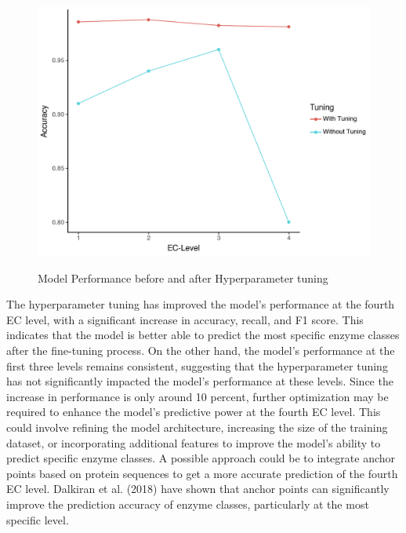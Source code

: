 \begin{figure}[!h]
    \centering
    \begin{minipage}[t]{\textwidth}
    \caption{Model Performance before and after Hyperparameter tuning}
    \includegraphics[scale=0.55]{img/model-performance-comparison.png}
    \label{fig:performance-comparison}
    \end{minipage}
\end{figure}

The hyperparameter tuning has improved the model's performance at the fourth EC level, with a significant increase in accuracy, recall, and F1 score. This indicates that the model is better able to predict the most specific enzyme classes after the fine-tuning process. On the other hand, the model's performance at the first three levels remains consistent, suggesting that the hyperparameter tuning has not significantly impacted the model's performance at these levels. Since the increase in performance is only around 10 percent, further optimization may be required to enhance the model's predictive power at the fourth EC level. This could involve refining the model architecture, increasing the size of the training dataset, or incorporating additional features to improve the model's ability to predict specific enzyme classes. A possible approach could be to integrate anchor points based on protein sequences to get a more accurate prediction of the fourth EC level. Dalkiran et al. (2018) have shown that anchor points can significantly improve the prediction accuracy of enzyme classes, particularly at the most specific level. \autocite{dalkiranECPredToolPrediction2018a}

